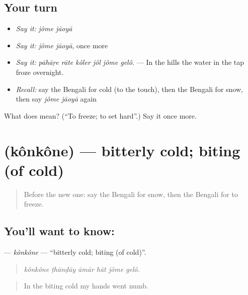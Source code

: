 \subsection*{Your turn}
\begin{itemize}
\raggedright
  \item \emph{Say it:} \emph{jôme jāoyā}
  \item \emph{Say it:} \emph{jôme jāoyā}, once more
  \item \emph{Say it:} \emph{pāhāṛe rāte kôler jôl jôme gelô.} — In the hills the water in the tap froze overnight.
  \item \emph{Recall:} say the Bengali for cold (to the touch), then the Bengali for snow, then say \emph{jôme jāoyā} again
\end{itemize}

\begin{tcolorbox}[breakable,colback=teal!4,colframe=teal!35!black,title={Before you move on}]
What does   mean? (\textquotedblleft{}To freeze; to set hard\textquotedblright{}.) Say it once more.
\end{tcolorbox}
\section[\texorpdfstring{\bn{কনকনে} (kônkône)}{কনকনে (kônkône)}]{ (kônkône) — bitterly cold; biting (of cold)}

\label{lesson:BN-C426-konkone}



\begin{quote}
Before the new one: say the Bengali for snow, then the Bengali for to freeze.
\end{quote}

\subsection*{You'll want to know: }
\textbf{} — \emph{kônkône} — \textquotedblleft{}bitterly cold; biting (of cold)\textquotedblright{}.

\begin{quote}
     
\end{quote}

\begin{quote}
\emph{kônkône ṭhānḍāy āmār hāt jôme gelô.}
\end{quote}

\begin{quote}
In the biting cold my hands went numb.
\end{quote}

